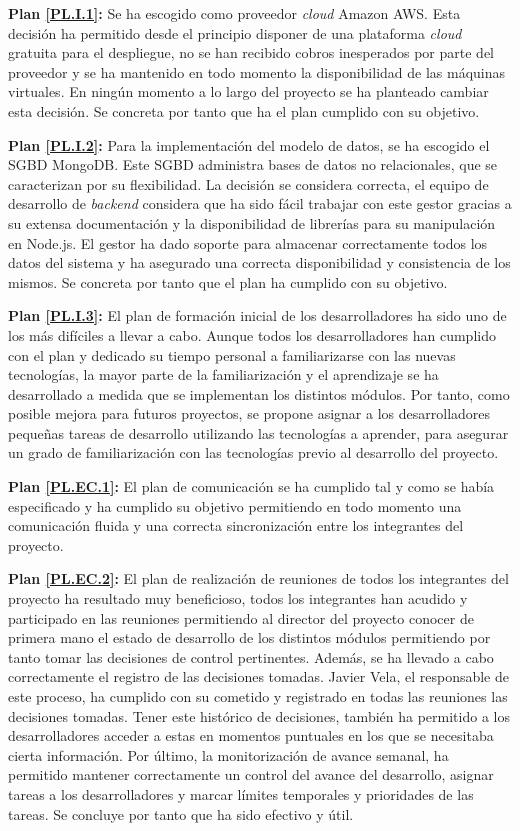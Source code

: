 \documentclass{article}
\begin{document}
\textbf{Plan \ref{PL.I.1}:}
Se ha escogido como proveedor \textit{cloud} Amazon AWS. Esta decisión ha permitido desde el principio disponer de una plataforma \textit{cloud} gratuita para el despliegue, no se han recibido cobros inesperados por parte del proveedor y se ha mantenido en todo momento la disponibilidad de las máquinas virtuales. En ningún momento a lo largo del proyecto se ha planteado cambiar esta decisión. Se concreta por tanto que ha el plan cumplido con su objetivo.

\textbf{Plan \ref{PL.I.2}:}
Para la implementación del modelo de datos, se ha escogido el SGBD MongoDB. Este SGBD administra bases de datos no relacionales, que se caracterizan por su flexibilidad. La decisión se considera correcta, el equipo de desarrollo de \textit{backend} considera que ha sido fácil trabajar con este gestor gracias a su extensa documentación y la disponibilidad de librerías para su manipulación en Node.js. El gestor ha dado soporte para almacenar correctamente todos los datos del sistema y ha asegurado una correcta disponibilidad y consistencia de los mismos. Se concreta por tanto que el plan ha cumplido con su objetivo.

\textbf{Plan \ref{PL.I.3}:}
El plan de formación inicial de los desarrolladores ha sido uno de los más difíciles a llevar a cabo. Aunque todos los desarrolladores han cumplido con el plan y dedicado su tiempo personal a familiarizarse con las nuevas tecnologías, la mayor parte de la familiarización y el aprendizaje se ha desarrollado a medida que se implementan los distintos módulos. Por tanto, como posible mejora para futuros proyectos, se propone asignar a los desarrolladores pequeñas tareas de desarrollo utilizando las tecnologías a aprender, para asegurar un grado de familiarización con las tecnologías previo al desarrollo del proyecto.

\textbf{Plan \ref{PL.EC.1}:}
El plan de comunicación se ha cumplido tal y como se había especificado y ha cumplido su objetivo permitiendo en todo momento una comunicación fluida y una correcta sincronización entre los integrantes del proyecto.

\textbf{Plan \ref{PL.EC.2}:}
El plan de realización de reuniones de todos los integrantes del proyecto ha resultado muy beneficioso, todos los integrantes han acudido y participado en las reuniones permitiendo al director del proyecto conocer de primera mano el estado de desarrollo de los distintos módulos permitiendo por tanto tomar las decisiones de control pertinentes.
Además, se ha llevado a cabo correctamente el registro de las decisiones tomadas. Javier Vela, el responsable de este proceso, ha cumplido con su cometido y registrado en todas las reuniones las decisiones tomadas. Tener este histórico de decisiones, también ha permitido a los desarrolladores acceder a estas en momentos puntuales en los que se necesitaba cierta información. Por último, la monitorización de avance semanal, ha permitido mantener correctamente un control del avance del desarrollo, asignar tareas a los desarrolladores y marcar límites temporales y prioridades de las tareas. Se concluye por tanto que ha sido efectivo y útil.
\end{document}
